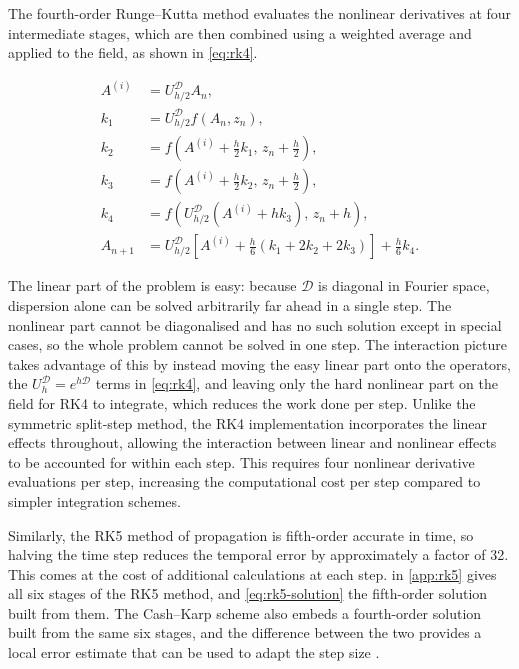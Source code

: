 The fourth-order Runge--Kutta method evaluates the nonlinear derivatives at four intermediate stages,
which are then combined using a weighted average and applied to the field, as shown in \cref{eq:rk4}.

\begin{equation}
  \label{eq:rk4}
  \begin{aligned}
    A^{(i)} &= U_{h/2}^{\mathcal{D}} A_n, \\
    k_1 &= U_{h/2}^{\mathcal{D}} f(A_n, z_n), \\
    k_2 &= f\!\left(A^{(i)} + \tfrac{h}{2}k_1,\, z_n + \tfrac{h}{2}\right), \\
    k_3 &= f\!\left(A^{(i)} + \tfrac{h}{2}k_2,\, z_n + \tfrac{h}{2}\right), \\
    k_4 &= f\!\left(U_{h/2}^{\mathcal{D}}\left(A^{(i)} + h k_3\right),\, z_n + h\right), \\
    A_{n+1} &= U_{h/2}^{\mathcal{D}}\left[A^{(i)} + \tfrac{h}{6}\left(k_1 + 2k_2 + 2k_3\right)\right] + \tfrac{h}{6}k_4.
  \end{aligned}
\end{equation}

The linear part of the problem is easy: because $\mathcal{D}$ is diagonal in Fourier space, dispersion 
alone can be solved arbitrarily far ahead in a single step. The nonlinear part cannot be diagonalised and 
has no such solution except in special cases, so the whole problem cannot be solved in one step. The interaction 
picture takes advantage of this by instead moving the easy linear part onto the operators, the 
$U^{\mathcal{D}}_{h} = e^{h\mathcal{D}}$ terms in \cref{eq:rk4}, and leaving only the hard nonlinear part on the field 
for RK4 to integrate, which reduces the work done per step. Unlike the symmetric split-step method, the RK4 implementation 
incorporates the linear effects throughout, allowing the interaction between linear and nonlinear effects to be accounted 
for within each step. This requires four nonlinear derivative evaluations per step, increasing the computational cost per 
step compared to simpler integration schemes.

Similarly, the RK5 method of propagation is fifth-order accurate in time, so halving the time step reduces the temporal error by approximately a factor of 32. This comes at the cost of additional calculations at each step.  in \cref{app:rk5} gives all six stages of the RK5 method, and \cref{eq:rk5-solution} the fifth-order solution built from them. The Cash--Karp scheme also embeds a fourth-order solution built from the same six stages, and the difference between the two provides a local error estimate that can be used to adapt the step size \parencite{balacMathematicalAnalysisAdaptive2014}.


